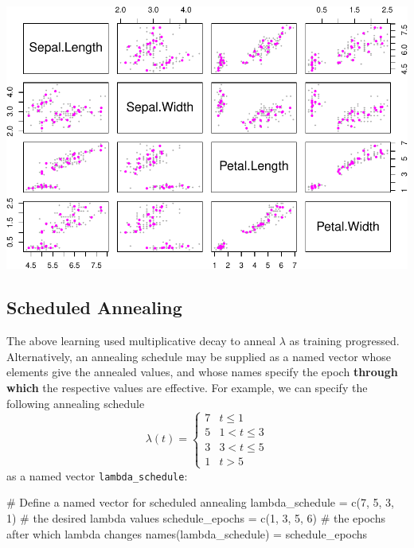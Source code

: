 \documentclass[11pt,]{article}
\newenvironment{Shaded}{}{}
\newcommand{\CommentTok}[1]{\textcolor[rgb]{0.00,0.50,0.00}{#1}}
\newcommand{\DecValTok}[1]{#1}
\newcommand{\KeywordTok}[1]{\textcolor[rgb]{0.00,0.00,1.00}{#1}}
\newcommand{\NormalTok}[1]{#1}
\newcommand{\StringTok}[1]{\textcolor[rgb]{0.00,0.50,0.50}{#1}}
\begin{document}
\begin{center}\includegraphics{NeuralGas-vignette_files/figure-latex/unnamed-chunk-6-1} \end{center}

\hypertarget{scheduled-annealing}{%
\subsection{Scheduled Annealing}\label{scheduled-annealing}}

The above learning used multiplicative decay to anneal \(\lambda\) as
training progressed. Alternatively, an annealing schedule may be
supplied as a named vector whose elements give the annealed values, and
whose names specify the epoch \textbf{through which} the respective
values are effective. For example, we can specify the following
annealing schedule
\[ \lambda(t) = \begin{cases} 7 & t \leq 1 \\ 5 & 1 < t \leq 3 \\ 3 & 3 < t \leq 5 \\ 1 & t > 5 \end{cases} \]
as a named vector \texttt{lambda\_schedule}:

\begin{Shaded}
\begin{Highlighting}[]
\CommentTok{# Define a named vector for scheduled annealing }
\NormalTok{lambda_schedule =}\StringTok{ }\KeywordTok{c}\NormalTok{(}\DecValTok{7}\NormalTok{, }\DecValTok{5}\NormalTok{, }\DecValTok{3}\NormalTok{, }\DecValTok{1}\NormalTok{)  }\CommentTok{# the desired lambda values }
\NormalTok{schedule_epochs =}\StringTok{ }\KeywordTok{c}\NormalTok{(}\DecValTok{1}\NormalTok{, }\DecValTok{3}\NormalTok{, }\DecValTok{5}\NormalTok{, }\DecValTok{6}\NormalTok{)  }\CommentTok{# the epochs after which lambda changes}
\KeywordTok{names}\NormalTok{(lambda_schedule) =}\StringTok{ }\NormalTok{schedule_epochs}
\end{Highlighting}
\end{Shaded}
\end{document}

